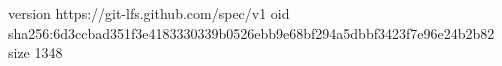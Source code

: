 version https://git-lfs.github.com/spec/v1
oid sha256:6d3ccbad351f3e4183330339b0526ebb9e68bf294a5dbbf3423f7e96e24b2b82
size 1348

